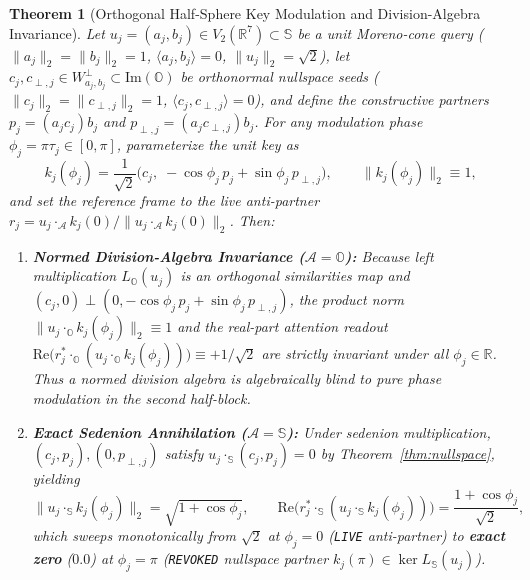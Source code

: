 \documentclass[11pt,a4paper]{article}
\newtheorem{theorem}{Theorem}[section]
\theoremstyle{definition}
\theoremstyle{remark}
\newcommand{\R}{\mathbb{R}}
\newcommand{\Oc}{\mathbb{O}}
\newcommand{\Se}{\mathbb{S}}
\newcommand{\ImPart}{\mathrm{Im}}
\newcommand{\RePart}{\mathrm{Re}}
\begin{document}
\begin{theorem}[Orthogonal Half-Sphere Key Modulation and Division-Algebra Invariance]
\label{thm:half_sphere}
Let $u_j = (a_j, b_j) \in V_2(\R^7) \subset \Se$ be a unit Moreno-cone query ($\|a_j\|_2 = \|b_j\|_2 = 1$, $\langle a_j, b_j \rangle = 0$, $\|u_j\|_2 = \sqrt{2}$), let $c_j, c_{\perp, j} \in W_{a_j, b_j}^\perp \subset \ImPart(\Oc)$ be orthonormal nullspace seeds ($\|c_j\|_2 = \|c_{\perp, j}\|_2 = 1$, $\langle c_j, c_{\perp, j} \rangle = 0$), and define the constructive partners $p_j = (a_j c_j) b_j$ and $p_{\perp, j} = (a_j c_{\perp, j}) b_j$. For any modulation phase $\phi_j = \pi \tau_j \in [0, \pi]$, parameterize the unit key as
\begin{equation}
\label{eq:half_sphere_key}
k_j(\phi_j) = \frac{1}{\sqrt{2}}\big(c_j, \; -\cos\phi_j \, p_j + \sin\phi_j \, p_{\perp, j}\big), \qquad \|k_j(\phi_j)\|_2 \equiv 1,
\end{equation}
and set the reference frame to the live anti-partner $r_j = u_j \cdot_{\mathcal{A}} k_j(0) / \|u_j \cdot_{\mathcal{A}} k_j(0)\|_2$. Then:
\begin{enumerate}
    \item \textbf{Normed Division-Algebra Invariance ($\mathcal{A} = \Oc$):} Because left multiplication $L_{\Oc}(u_j)$ is an orthogonal similarities map and $(c_j, 0) \perp (0, -\cos\phi_j \, p_j + \sin\phi_j \, p_{\perp, j})$, the product norm $\|u_j \cdot_{\Oc} k_j(\phi_j)\|_2 \equiv 1$ and the real-part attention readout $\RePart\big(r_j^* \cdot_{\Oc} (u_j \cdot_{\Oc} k_j(\phi_j))\big) \equiv +1/\sqrt{2}$ are strictly invariant under all $\phi_j \in \R$. Thus a normed division algebra is algebraically blind to pure phase modulation in the second half-block.
    \item \textbf{Exact Sedenion Annihilation ($\mathcal{A} = \Se$):} Under sedenion multiplication, $(c_j, p_j), (0, p_{\perp, j})$ satisfy $u_j \cdot_{\Se} (c_j, p_j) = 0$ by Theorem~\ref{thm:nullspace}, yielding
    \begin{equation}
    \label{eq:sed_phase_norm}
    \big\|u_j \cdot_{\Se} k_j(\phi_j)\big\|_2 = \sqrt{1 + \cos\phi_j}, \qquad \RePart\big(r_j^* \cdot_{\Se} (u_j \cdot_{\Se} k_j(\phi_j))\big) = \frac{1 + \cos\phi_j}{\sqrt{2}},
    \end{equation}
    which sweeps monotonically from $\sqrt{2}$ at $\phi_j = 0$ (\texttt{LIVE} anti-partner) to \textbf{exact zero} ($0.0$) at $\phi_j = \pi$ (\texttt{REVOKED} nullspace partner $k_j(\pi) \in \ker L_{\Se}(u_j)$).
\end{enumerate}
\end{theorem}
\end{document}
